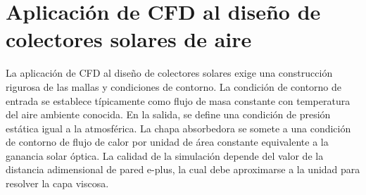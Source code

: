 \section{Aplicación de CFD al diseño de colectores solares de aire}
\label{sec:cap02_aplicacion_cfd}

La aplicación de CFD al diseño de colectores solares exige una construcción rigurosa de las mallas y condiciones de contorno.
La condición de contorno de entrada se establece típicamente como flujo de masa constante con temperatura del aire ambiente conocida.
En la salida, se define una condición de presión estática igual a la atmosférica.
La chapa absorbedora se somete a una condición de contorno de flujo de calor por unidad de área constante equivalente a la ganancia solar óptica.
La calidad de la simulación depende del valor de la distancia adimensional de pared e-plus, la cual debe aproximarse a la unidad para resolver la capa viscosa.
